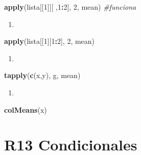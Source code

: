 \documentclass[]{book}
\newenvironment{Shaded}{\begin{snugshade}}{\end{snugshade}}
\newcommand{\CommentTok}[1]{\textcolor[rgb]{0.56,0.35,0.01}{\textit{#1}}}
\newcommand{\DecValTok}[1]{\textcolor[rgb]{0.00,0.00,0.81}{#1}}
\newcommand{\KeywordTok}[1]{\textcolor[rgb]{0.13,0.29,0.53}{\textbf{#1}}}
\newcommand{\NormalTok}[1]{#1}
\newcommand{\OperatorTok}[1]{\textcolor[rgb]{0.81,0.36,0.00}{\textbf{#1}}}
\begin{document}
\begin{Shaded}
\begin{Highlighting}[]
\KeywordTok{apply}\NormalTok{(lista[[}\DecValTok{1}\NormalTok{]][ ,}\DecValTok{1}\OperatorTok{:}\DecValTok{2}\NormalTok{], }\DecValTok{2}\NormalTok{, mean) }\CommentTok{#funciona}
\end{Highlighting}
\end{Shaded}

\begin{enumerate}
\def\labelenumi{\arabic{enumi}.}
\setcounter{enumi}{1}
\item
\end{enumerate}

\begin{Shaded}
\begin{Highlighting}[]
\KeywordTok{apply}\NormalTok{(lista[[}\DecValTok{1}\NormalTok{][}\DecValTok{1}\OperatorTok{:}\DecValTok{2}\NormalTok{], }\DecValTok{2}\NormalTok{, mean)}
\end{Highlighting}
\end{Shaded}

\begin{enumerate}
\def\labelenumi{\arabic{enumi}.}
\setcounter{enumi}{2}
\item
\end{enumerate}

\begin{Shaded}
\begin{Highlighting}[]
\KeywordTok{tapply}\NormalTok{(}\KeywordTok{c}\NormalTok{(x,y), g, mean)}
\end{Highlighting}
\end{Shaded}

\begin{enumerate}
\def\labelenumi{\arabic{enumi}.}
\setcounter{enumi}{3}
\item
\end{enumerate}

\begin{Shaded}
\begin{Highlighting}[]
\KeywordTok{colMeans}\NormalTok{(x)}
\end{Highlighting}
\end{Shaded}

\hypertarget{r13-condicionales}{%
\chapter*{R13 Condicionales}\label{r13-condicionales}}
\end{document}
